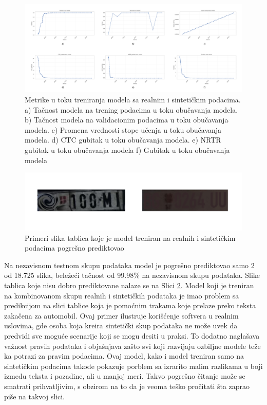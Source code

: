 \documentclass[a4paper,12pt]{article}
\begin{document}
	\begin{figure}[H]
		\centering
		\includegraphics[width=\textwidth]{assets/real-and-synthetic-data-metrics.png}
		\caption{Metrike u toku treniranja modela sa realnim i sintetičkim podacima. a) Tačnost modela na trening podacima u toku obučavanja modela. b) Tačnost modela na validacionim podacima u toku obučavanja modela. c) Promena vrednosti stope učenja u toku obučavanja modela. d) CTC gubitak u toku obučavanja modela. e) NRTR gubitak u toku obučavanja modela f) Gubitak u toku obučavanja modela}
		\label{fig:real-and-synthetic-data-metrics}
	\end{figure}
	
	\begin{figure}[H]
		\centering
		\includegraphics[width=\textwidth]{assets/bad-predictions-real-and-synthetic-data-model.png}
		\caption{Primeri slika tablica koje je model treniran na realnih i sintetičkim podacima pogrešno prediktovao}
		\label{fig:bad-predictions-real-and-synthetic-data-model}
	\end{figure}
	
	Na nezavisnom testnom skupu podataka model je pogrešno prediktovao samo 2 od 18.725 slika, beležeći tačnost od 99.98\% na nezavisnom skupu podataka. Slike tablica koje nisu dobro prediktovane nalaze se na Slici \ref{fig:bad-predictions-real-and-synthetic-data-model}. Model koji je treniran na kombinovanom skupu realnih i sintetičkih podataka je imao problem sa predikcijom na slici tablice koja je pomoćnim trakama koje prelaze preko teksta zakačena za automobil. Ovaj primer ilustruje korišćenje softvera u realnim uslovima, gde osoba koja kreira sintetički skup podataka ne može uvek da predvidi sve moguće scenarije koji se mogu desiti u praksi. To dodatno naglašava važnost pravih podataka i objašnjava zašto svi koji razvijaju ozbiljne modele teže ka potrazi za pravim podacima. Ovaj model, kako i model treniran samo na sintetičkim podacima takođe pokazuje porblem sa izrarito malim razlikama u boji između teksta i pozadine, ali u manjoj meri. Takvo pogrešno čitanje može se smatrati prihvatljivim, s obzirom na to da je veoma teško pročitati šta zaprao piše na takvoj slici.
	
\end{document}
